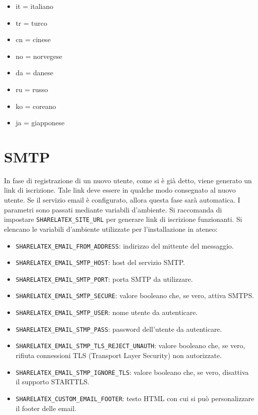 \begin{itemize}
\begin{multicols}{3}
\begin{itemize}
                \item it = italiano
                \item tr = turco
                \item cn = cinese
                \item no = norvegese
                \item da = danese
                \item ru = russo
                \item ko = coreano
                \item ja = giapponese
            \end{itemize}
        \end{multicols}
\end{itemize}

\section{SMTP}
\label{SMTP}
In fase di registrazione di un nuovo utente, come si è già detto, viene generato un link di iscrizione. Tale link deve essere in qualche modo consegnato al nuovo utente. Se il servizio email è configurato, allora questa fase sarà automatica. I parametri sono passati mediante variabili d'ambiente. Si raccomanda di impostare \verb|SHARELATEX_SITE_URL| per generare link di iscrizione funzionanti. Si elencano le variabili d'ambiente utilizzate per l'installazione in ateneo:
\begin{itemize}
    \item \verb|SHARELATEX_EMAIL_FROM_ADDRESS|: indirizzo del mittente del messaggio.
    \item \verb|SHARELATEX_EMAIL_SMTP_HOST|: host del servizio SMTP.
    \item \verb|SHARELATEX_EMAIL_SMTP_PORT|: porta SMTP da utilizzare.
    \item \verb|SHARELATEX_EMAIL_SMTP_SECURE|: valore booleano che, se vero, attiva SMTPS.
    \item \verb|SHARELATEX_EMAIL_SMTP_USER|: nome utente da autenticare.
    \item \verb|SHARELATEX_EMAIL_STMP_PASS|: password dell'utente da autenticare.
    \item \verb|SHARELATEX_EMAIL_STMP_TLS_REJECT_UNAUTH|: valore booleano che, se vero, rifiuta connessioni TLS (Transport Layer Security) non autorizzate.
    \item \verb|SHARELATEX_EMAIL_STMP_IGNORE_TLS|: valore booleano che, se vero, disattiva il supporto STARTTLS.
    \item \verb|SHARELATEX_CUSTOM_EMAIL_FOOTER|: testo HTML con cui si può personalizzare il footer delle email.
\end{itemize}